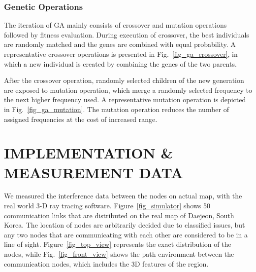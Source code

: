 \documentclass[10pt,twocolumn,twoside]{JCNtran}
\begin{document}
\subsubsection{Genetic Operations}
The iteration of GA mainly consists of crossover and mutation operations followed by fitness evaluation. During execution of crossover, the best individuals are randomly matched and the genes are combined with equal probability. A representative crossover operations is presented in Fig.~\ref{fig_ga_crossover}, in which a new individual is created by combining the genes of the two parents.

After the crossover operation, randomly selected children of the new generation are exposed to mutation operation, which merge a randomly selected frequency to the next higher frequency used. A representative mutation operation is depicted in Fig.~\ref{fig_ga_mutation}. The mutation operation reduces the number of assigned frequencies at the cost of increased range. 




\begin{figure*}[!t]
	\begin{center}
	\end{center}
	\caption{An example of topology for analysis with the measured data, covering Daejeon region in South Korea with 50 communication nodes. The topology is considering 3-D environments based on the real geographical features.}
	\label{fig_simulator}
\end{figure*}
\section{\uppercase{Implementation \& Measurement Data}}
\label{sec_implementation}

We measured the interference data between the nodes on actual map, with the real world 3-D ray tracing software. Figure~\ref{fig_simulator} shows 50 communication links that are distributed on the real map of Daejeon, South Korea. The location of nodes are arbitrarily decided due to classified issues, but any two nodes that are communicating with each other are considered to be in a line of sight.  Figure~\ref{fig_top_view} represents the exact distribution of the nodes, while Fig.~\ref{fig_front_view} shows the path environment between the communication nodes, which includes the 3D features of the region.
\end{document}
